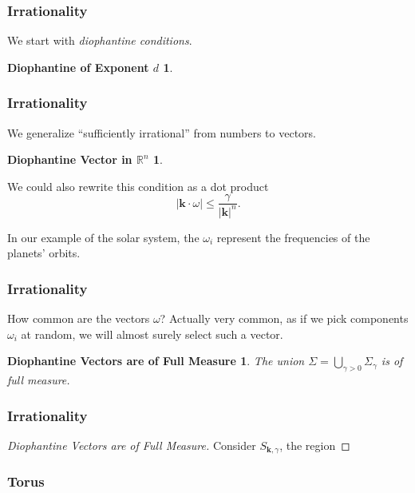 \documentclass{beamer}
\newcommand{\bp}[1]{\bm{#1}}
\begin{document}
\begin{frame}
  \frametitle{Irrationality}
  We start with \emph{diophantine conditions}.
  \newtheorem{dionum}{Diophantine of Exponent $d$}
  \begin{dionum}
    \dionumber{}
  \end{dionum}
\end{frame}

\begin{frame}
  \frametitle{Irrationality}
  We generalize ``sufficiently irrational'' from numbers to vectors.
  \newtheorem{diovec}{Diophantine Vector in $\mathbb{R}^n$}
  \begin{diovec}
    \diovector{}
  \end{diovec}

  We could also rewrite this condition as a dot product
  \begin{equation*}
    |\bp{k} \cdot \omega| \leq \frac{\gamma}{|\bp{k}|^n}.
  \end{equation*}

  In our example of the solar system, the $\omega_i$ represent the
  frequencies of the planets' orbits.
\end{frame}

\begin{frame}
  \frametitle{Irrationality}
  How common are the vectors $\omega$?
  Actually very common, as if we pick components $\omega_i$ at random, we will
  almost surely select such a vector.
  
  \newtheorem{diomeas}{Diophantine Vectors are of Full Measure}
  \begin{diomeas}
    The union $\Sigma = \bigcup_{\gamma > 0} \Sigma_{\gamma}$ is of full measure.
  \end{diomeas}
\end{frame}

\begin{frame}
  \frametitle{Irrationality}
  \begin{proof}[Diophantine Vectors are of Full Measure]
    Consider $S_{\bp{k}, \gamma}$, the region
  \end{proof}
\end{frame}

\begin{frame}
  \frametitle{Torus}
\end{frame}
\end{document}
